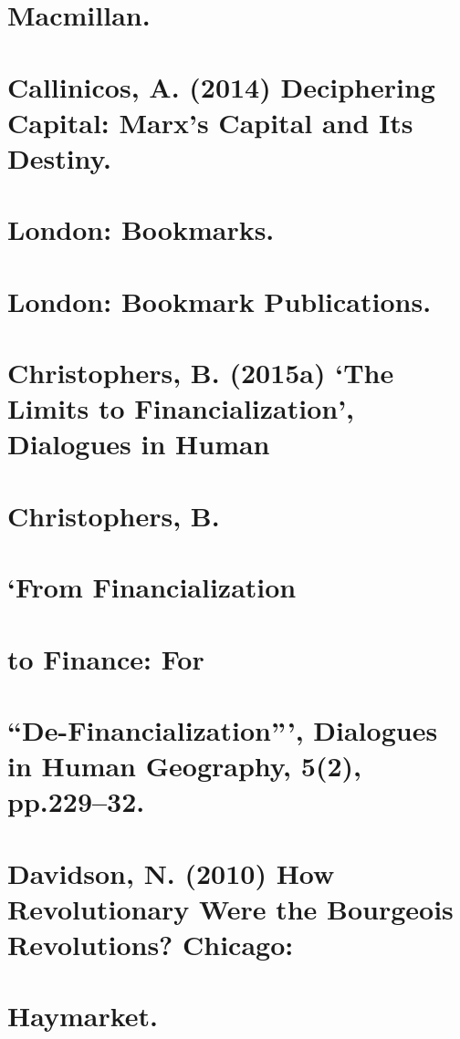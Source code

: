 \section{Macmillan.}


\section{Callinicos, A. (2014) Deciphering Capital: Marx’s Capital and Its Destiny.}


\section{London: Bookmarks.}


\section{London: Bookmark Publications.}


\section{Christophers, B. (2015a) ‘The Limits to Financialization’, Dialogues in Human}


\section{Christophers, B.}


\section{‘From Financialization}


\section{to Finance: For}


\section{“De-Financialization”’, Dialogues in Human Geography, 5(2), pp.229–32.}


\section{Davidson, N. (2010) How Revolutionary Were the Bourgeois Revolutions? Chicago:}


\section{Haymarket.}


